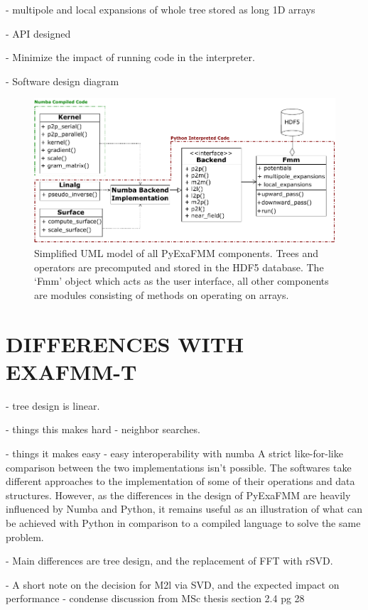 \documentclass{IEEEcsmag}
\begin{document}
- multipole and local expansions of whole tree stored as long 1D arrays


- API designed

- Minimize the impact of running code in the interpreter.

- Software design diagram

\begin{figure}
    \centerline{\includegraphics {figures/software.pdf}}
    \caption{Simplified UML model of all PyExaFMM components. Trees and operators are precomputed and stored in the HDF5 database. The `Fmm' object which acts as the user interface, all other components are modules consisting of methods on operating on arrays.}
    \label{fig:design}
\end{figure}

\section{DIFFERENCES WITH EXAFMM-T}

- tree design is linear. 

- things this makes hard - neighbor searches.

- things it makes easy - easy interoperability with numba
A strict like-for-like comparison between the two implementations isn't possible. The softwares take different approaches to the implementation of some of their operations and data structures. However, as the differences in the design of PyExaFMM are heavily influenced by Numba and Python, it remains useful as an illustration of what can be achieved with Python in comparison to a compiled language to solve the same problem.

- Main differences are tree design, and the replacement of FFT with rSVD.

- A short note on the decision for M2l via SVD, and the expected impact on performance - condense discussion from MSc thesis section 2.4 pg 28
\end{document}
